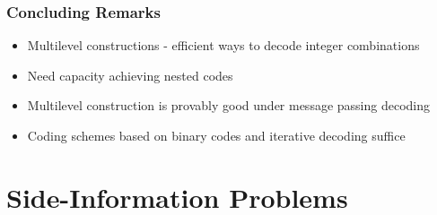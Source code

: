 \documentclass[10pt,presentation]{beamer}
\begin{document}
\begin{frame}\frametitle{Concluding Remarks}
    \begin{itemize}
        \item Multilevel constructions - efficient ways to decode integer combinations
               \vspace{5pt}
        \item Need capacity achieving nested codes
                \vspace{5pt}
        \item Multilevel construction is provably good under message passing decoding
               \vspace{5pt}
               \pause
        \item Coding schemes based on \alert{binary codes and iterative decoding} suffice
    \end{itemize}
\end{frame}

\section{Side-Information Problems}
\end{document}
